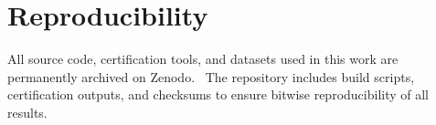 \documentclass[11pt]{article}
\theoremstyle{inline}
\theoremstyle{break}
\theoremstyle{break}
\theoremstyle{break}
\theoremstyle{break}
\theoremstyle{break}
\theoremstyle{break}
\theoremstyle{break}
\theoremstyle{inline}
\begin{document}
\section{Reproducibility}

All source code, certification tools, and datasets used in this work are permanently archived on Zenodo.~\cite{Riemers2025SieveGoldbach}  
The repository includes build scripts, certification outputs, and checksums to ensure bitwise reproducibility of all results.

\clearpage


\end{document}

